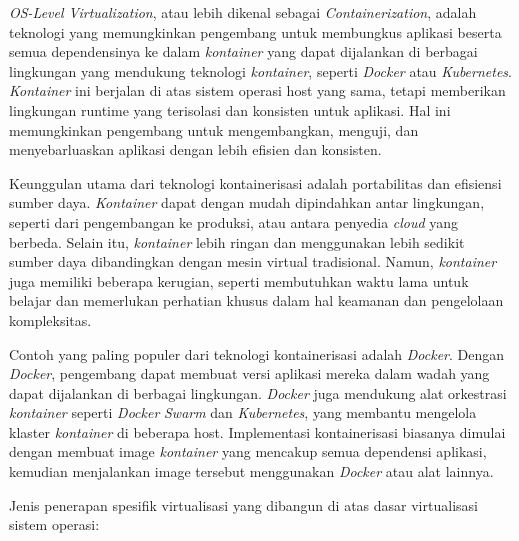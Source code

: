 \documentclass[12pt]{article}
\begin{document}
\begin{enumerate}
    \par \textit{OS-Level Virtualization}, atau lebih dikenal sebagai \textit{Containerization}, adalah teknologi yang memungkinkan pengembang untuk membungkus aplikasi beserta semua dependensinya ke dalam \textit{kontainer} yang dapat dijalankan di berbagai lingkungan yang mendukung teknologi \textit{kontainer}, seperti \textit{Docker} atau \textit{Kubernetes}. \textit{Kontainer} ini berjalan di atas sistem operasi host yang sama, tetapi memberikan lingkungan runtime yang terisolasi dan konsisten untuk aplikasi. Hal ini memungkinkan pengembang untuk mengembangkan, menguji, dan menyebarluaskan aplikasi dengan lebih efisien dan konsisten.

    \par Keunggulan utama dari teknologi kontainerisasi adalah portabilitas dan efisiensi sumber daya. \textit{Kontainer} dapat dengan mudah dipindahkan antar lingkungan, seperti dari pengembangan ke produksi, atau antara penyedia \textit{cloud} yang berbeda. Selain itu, \textit{kontainer} lebih ringan dan menggunakan lebih sedikit sumber daya dibandingkan dengan mesin virtual tradisional. Namun, \textit{kontainer} juga memiliki beberapa kerugian, seperti membutuhkan waktu lama untuk belajar dan memerlukan perhatian khusus dalam hal keamanan dan pengelolaan kompleksitas.
    
    \par Contoh yang paling populer dari teknologi kontainerisasi adalah \textit{Docker}. Dengan \textit{Docker}, pengembang dapat membuat versi aplikasi mereka dalam wadah yang dapat dijalankan di berbagai lingkungan. \textit{Docker} juga mendukung alat orkestrasi \textit{kontainer} seperti \textit{Docker} \textit{Swarm} dan \textit{Kubernetes}, yang membantu mengelola klaster \textit{kontainer} di beberapa host. Implementasi kontainerisasi biasanya dimulai dengan membuat image \textit{kontainer} yang mencakup semua dependensi aplikasi, kemudian menjalankan image tersebut menggunakan \textit{Docker} atau alat lainnya.
\end{enumerate}

\par Jenis penerapan spesifik virtualisasi yang dibangun di atas dasar virtualisasi sistem operasi:
\end{document}
